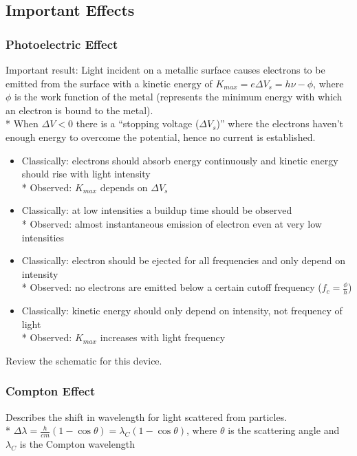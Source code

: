 \subsection{Important Effects}

\subsubsection{Photoelectric Effect}
Important result: Light incident on a metallic surface causes electrons to be emitted from the surface with a kinetic energy of \(K_{max}=e\Delta V_s=h\nu-\phi\), where \(\phi\) is the work function of the metal (represents the minimum energy with which an electron is bound to the metal).\\*
When \(\Delta V<0\) there is a ``stopping voltage (\(\Delta V_s\))'' where the electrons haven't enough energy to overcome the potential, hence no current is established.
\begin{itemize}
\item Classically: electrons should absorb energy continuously and kinetic energy should rise with light intensity\\*
Observed: \(K_{max}\) depends on \(\Delta V_s\)
\item Classically: at low intensities a buildup time should be observed\\*
Observed: almost instantaneous emission of electron even at very low intensities
\item Classically: electron should be ejected for all frequencies and only depend on intensity\\*
Observed: no electrons are emitted below a certain cutoff frequency (\(f_c=\frac{\phi}{h}\))
\item Classically: kinetic energy should only depend on intensity, not frequency of light\\*
Observed: \(K_{max}\) increases with light frequency
\end{itemize}
Review the schematic for this device.

\subsubsection{Compton Effect}
Describes the shift in wavelength for light scattered from particles.\\*
\(\Delta\lambda=\frac{h}{cm}\left(1-\cos{\theta}\right)=\lambda_C\left(1-\cos{\theta}\right)\), where \(\theta\) is the scattering angle and \(\lambda_C\) is the Compton wavelength

